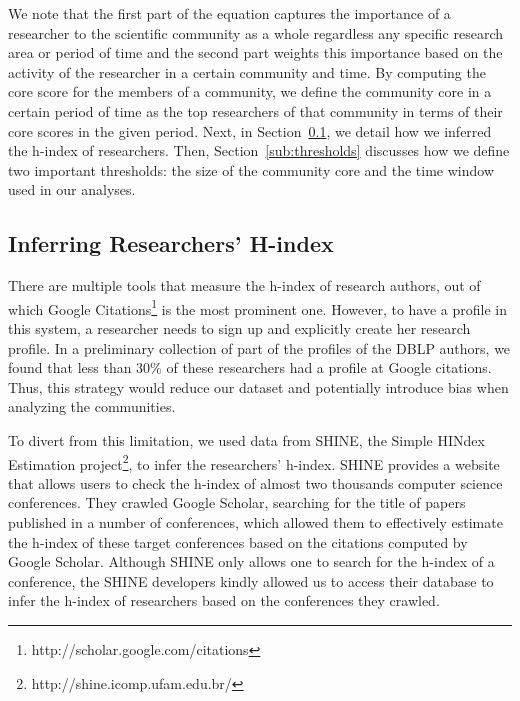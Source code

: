 
We note that the first part of the equation captures the importance of a researcher to the scientific community as a whole regardless any specific research area or period of time and the second part weights this
importance based on the activity of the researcher in a certain community and time.  By computing the core score for the members of a community, we define the community core in a
certain period of time as the top researchers of that community in terms of their core scores in the given period. Next, in Section~\ref{sub:hindex}, we detail how we inferred the
h-index of researchers. 
Then, Section~\ref{sub:thresholds} discusses how we define two important thresholds: the size of the community core and the time window used in our analyses.


\subsection{Inferring Researchers' H-index}
\label{sub:hindex}

There are multiple tools that measure the h-index of research authors, out of which Google Citations\footnote{http://scholar.google.com/citations} is the most prominent one.
However, to have a profile in this system, a researcher needs to sign up and explicitly create her research profile.  In a preliminary collection of part of the profiles of
the DBLP authors, we found that less than 30\% of these researchers had a profile at Google citations. Thus, this strategy would reduce our dataset and
potentially introduce bias when analyzing the communities.
 
To divert from this limitation, we used data from SHINE, the Simple HINdex Estimation project\footnote{http://shine.icomp.ufam.edu.br/}, to infer the researchers' h-index.
SHINE provides a website that allows users to check the h-index of almost two thousands computer science conferences. They crawled Google Scholar, searching for the title of papers
published in a number of conferences, which allowed them to effectively estimate the h-index of these target conferences based on the citations computed by Google Scholar. Although
SHINE only allows one to search for the h-index of a conference, the SHINE developers kindly allowed us to access their database to infer the h-index of researchers based on the
conferences they crawled.


